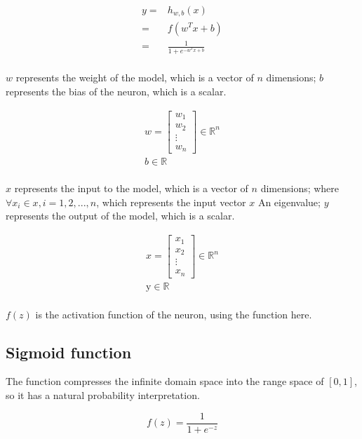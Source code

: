 \begin{content}
\[\begin{aligned}
  y = & {h_{w,b}}(x) \\ 
   = & f({w^T}x + b) \\ 
   = & \frac{1}{{1 + {e^{ - {w^T}x + b}}}} \\ 
\end{aligned} \]

$w$ represents the weight of the model, which is a vector of $n$ dimensions; $b$ represents the bias of the neuron, which is a scalar.

\[\begin{gathered}
  w = \left[ {\begin{array}{*{20}{c}}
  {{w_1}} \\ 
  {{w_2}} \\ 
   \vdots \\ 
  {{w_n}} 
\end{array}} \right] \in {\mathbb{R}^n} \\ 
  b \in \mathbb{R} \\ 
\end{gathered} \]

$x$ represents the input to the model, which is a vector of $n$ dimensions; where $\forall {x_i} \in x,i = 1,2,...,n$, which represents the input vector $x$ An eigenvalue; $y$ represents the output of the model, which is a scalar.

\[\begin{gathered}
  x = \left[ {\begin{array}{*{20}{c}}
  {{x_1}} \\ 
  {{x_2}} \\ 
   \vdots \\ 
  {{x_n}} 
\end{array}} \right] \in {\mathbb{R}^n} \\ 
  {\text{y}} \in {\mathbb{R}} \\ 
\end{gathered}\]

$f(z)$ is the activation function of the neuron, using the  function here.

\subsection{Sigmoid function}

The  function compresses the infinite domain space into the range space of $[0, 1]$, so it has a natural probability interpretation.

\[
f(z) = \frac{1}{{1 + {e^{ - z}}}}
\]



\end{content}
